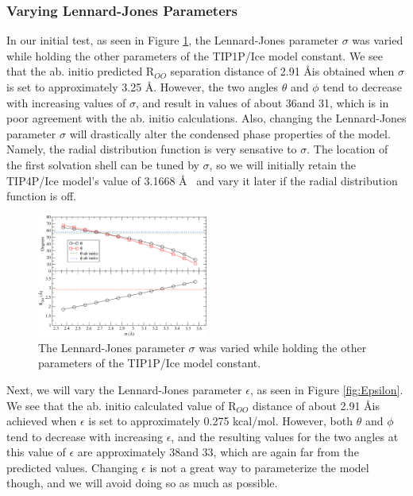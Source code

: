 \documentclass[aps, jcp, prl, reprint, groupedaddress, superscriptaddress, twocolumn]{revtex4-1}
\begin{document}
\subsubsection{Varying Lennard-Jones Parameters}
In our initial test, as seen in Figure \ref{fig:Sigma}, the Lennard-Jones 
parameter $\sigma$ was varied 
while holding the other parameters of the TIP1P/Ice model constant. We see that
the ab. initio predicted R$_{OO}$ separation distance of 2.91 \AA is obtained
when $\sigma$ is set to approximately 3.25 \AA . However, the two angles 
$\theta$ and $\phi$ tend to decrease with increasing values of $\sigma$, 
and result in values of about 36\degree and 31\degree, which is in poor 
agreement with the ab. initio calculations. Also, changing the Lennard-Jones
parameter $\sigma$ will drastically alter the condensed phase properties
of the model. Namely, the radial distribution function is very sensative to
$\sigma$. The location of the first solvation shell can be tuned by $\sigma$,
so we will initially retain the TIP4P/Ice model's value of 3.1668 \AA~ and vary
it later if the radial distribution function is off.


\begin{figure}[h!]
\includegraphics[width = 0.5\textwidth]{Test1_plot.pdf}
\caption{\label{fig:Sigma} The Lennard-Jones parameter $\sigma$ was varied while holding the other parameters of the TIP1P/Ice model constant.}
\end{figure}


Next, we will vary the Lennard-Jones parameter $\epsilon$, as seen in 
Figure \ref{fig:Epsilon}. We see that the ab. initio calculated value 
of R$_{OO}$ 
distance of about 2.91 \AA is achieved when $\epsilon$ is set to 
approximately 0.275 kcal/mol. However, both $\theta$ and $\phi$ tend to 
decrease with increasing $\epsilon$, and the resulting values for the two 
angles at this value of $\epsilon$ are approximately 38\degree and 33\degree,
which are again far from the predicted values. Changing $\epsilon$ is not a
great way to parameterize the model though, and we will avoid doing so as much
as possible.
\end{document}
